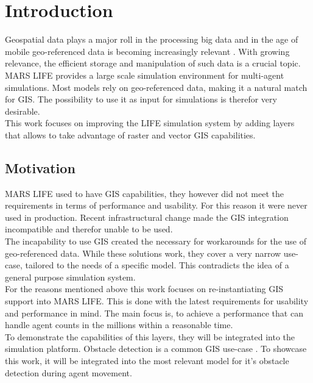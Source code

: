 
\chapter{Introduction}
Geospatial data plays a major roll in the processing big data and in the age of mobile geo-referenced data is becoming increasingly relevant \citep{Lee2015, Kitchin2013, Graham2013}. With growing relevance, the efficient storage and manipulation of such data is a crucial topic.\\
MARS LIFE provides a large scale simulation environment for multi-agent simulations. Most models rely on geo-referenced data, making it a natural match for GIS. The possibility to use it as input for simulations is therefor very desirable.\\
This work focuses on improving the LIFE simulation system by adding layers that allows to take advantage of raster and vector GIS capabilities.



\section{Motivation}
MARS LIFE used to have GIS capabilities, they however did not meet the requirements in terms of performance and usability. For this reason it were never used in production. Recent infrastructural change made the GIS integration incompatible and therefor unable to be used.\\
The incapability to use GIS created the necessary for workarounds for the use of geo-referenced data. While these solutions work, they cover a very narrow use-case, tailored to the needs of a specific model. This contradicts the idea of a general purpose simulation system.\\
For the reasons mentioned above this work focuses on re-instantiating GIS support into MARS LIFE. This is done with the latest requirements for usability and performance in mind. The main focus is, to achieve a performance that can handle agent counts in the millions within a reasonable time.\\
To demonstrate the capabilities of this layers, they will be integrated into the simulation platform. Obstacle detection is a common GIS use-case \cite{Wang2016}. To showcase this work, it will be integrated into the most relevant model for it's obstacle detection during agent movement.
